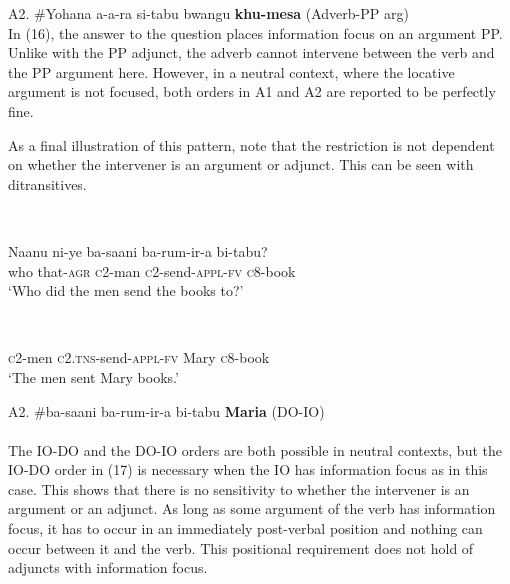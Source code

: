 \documentclass[output=paper]{langsci/langscibook}
\begin{document}
\gll A2.  \#Yohana   a-a-ra   si-tabu      bwangu   \textbf{khu-mesa}         (Adverb-PP arg)\\
In (16), the answer to the question places information focus on an argument PP. Unlike with the PP adjunct, the adverb cannot intervene between the verb and the PP argument here. However, in a neutral context, where the locative argument is not focused, both orders in A1 and A2 are reported to be perfectly fine.

  As a final illustration of this pattern, note that the restriction is not dependent on whether the intervener is an argument or adjunct. This can be seen with ditransitives. 

\begin{listWWviiiNumxlileveli}
\item \ea\label{ex:}
\\
\end{listWWviiiNumxlileveli}
\gll   Naanu    ni-ye    ba-saani   ba-rum-ir-a     bi-tabu?\\
     who     that-\textsc{agr}   \textsc{c}2-man   \textsc{c}2-send-\textsc{appl-fv}   \textsc{c}8-book\\
\glt ‘Who did the men send the books to?’
\z

\begin{listWWviiiNumxlileveli}
\end{listWWviiiNumxlileveli}
\begin{listWWviiiNumxlileveli}
\ea\label{ex:}
\\
\end{listWWviiiNumxlileveli}
       \textsc{c}2-men   \textsc{c2.tns}{}-send-\textsc{appl-fv}   Mary      \textsc{c}8-book  \\
\glt    ‘The men sent Mary books.’
\z

\gll A2.  \#ba-saani  ba-rum-ir-a      bi-tabu   \textbf{Maria}  (DO-IO) \\\\
The IO-DO and the DO-IO orders are both possible in neutral contexts, but the IO-DO order in (17) is necessary when the IO has information focus as in this case. This shows that there is no sensitivity to whether the intervener is an argument or an adjunct. As long as some argument of the verb has information focus, it has to occur in an immediately post-verbal position and nothing can occur between it and the verb. This positional requirement does not hold of adjuncts with information focus.
\end{document}
